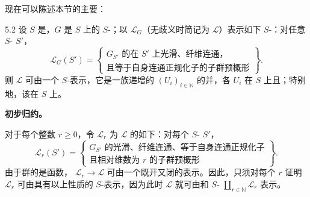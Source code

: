 现在可以陈述本节的主要：
\begin{SGAresult}{}{5.2}
设 $S$ 是，$G$ 是 $S$ 上的 $S$-；以 $\mathscr L_G$（无歧义时简记为 $\mathscr L$）表示如下 $S$-：对任意 $S$- $S'$，
\[
\mathscr L_G(S')=\left\{\begin{array}{l}
G_{S'}\text{ 的在 }S'\text{ 上光滑、纤维连通，}\\
\text{且等于自身连通正规化子的子群预概形}
\end{array}\right\}.
\]
则 $\mathscr L$ 可由一个 $S$-表示，它是一族递增的 $(U_i)_{i\in\mathbb N}$ 的并，各 $U_i$ 在 $S$ 上且；特别地，该在 $S$ 上。
\end{SGAresult}
\textbf{初步归约。}

对于每个整数 $r\geq0$，令 $\mathscr L_r$ 为 $\mathscr L$ 的如下：对每个 $S$- $S'$，
\[
\mathscr L_r(S')=\left\{\begin{array}{l}
G_{S'}\text{ 的光滑、纤维连通、等于自身连通正规化子}\\
\text{且相对维数为 }r\text{ 的子群预概形}
\end{array}\right\}.
\]
由于群的是函数， $\mathscr L_r\to\mathscr L$ 可由一个既开又闭的表示。因此，只须对每个 $r$ 证明 $\mathscr L_r$ 可由具有以上性质的 $S$-表示，因为此时 $\mathscr L$ 就可由和 $S$- $\coprod_{r\in\mathbb N}\mathscr L_r$ 表示。

